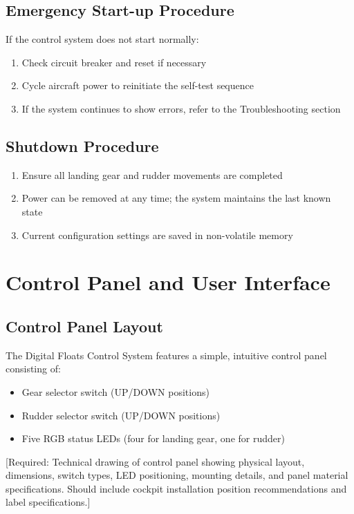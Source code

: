 \documentclass[12pt,a4paper,twoside,openright]{book}
\begin{document}
\subsection{Emergency Start-up Procedure}
If the control system does not start normally:
\begin{enumerate}
    \item Check circuit breaker and reset if necessary
    \item Cycle aircraft power to reinitiate the self-test sequence
    \item If the system continues to show errors, refer to the Troubleshooting section
\end{enumerate}

\subsection{Shutdown Procedure}
\begin{enumerate}
    \item Ensure all landing gear and rudder movements are completed
    \item Power can be removed at any time; the system maintains the last known state
    \item Current configuration settings are saved in non-volatile memory
\end{enumerate}

\section{Control Panel and User Interface}

\subsection{Control Panel Layout}
The Digital Floats Control System features a simple, intuitive control panel consisting of:
\begin{itemize}
    \item Gear selector switch (UP/DOWN positions)
    \item Rudder selector switch (UP/DOWN positions)
    \item Five RGB status LEDs (four for landing gear, one for rudder)
\end{itemize}

{\color{missingred}[Required: Technical drawing of control panel showing physical layout, dimensions, switch types, LED positioning, mounting details, and panel material specifications. Should include cockpit installation position recommendations and label specifications.]}
\end{document}
